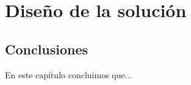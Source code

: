 \chapter{Diseño de la solución}\label{cap:diseño}


\section{Conclusiones}
En este capítulo concluimos que...